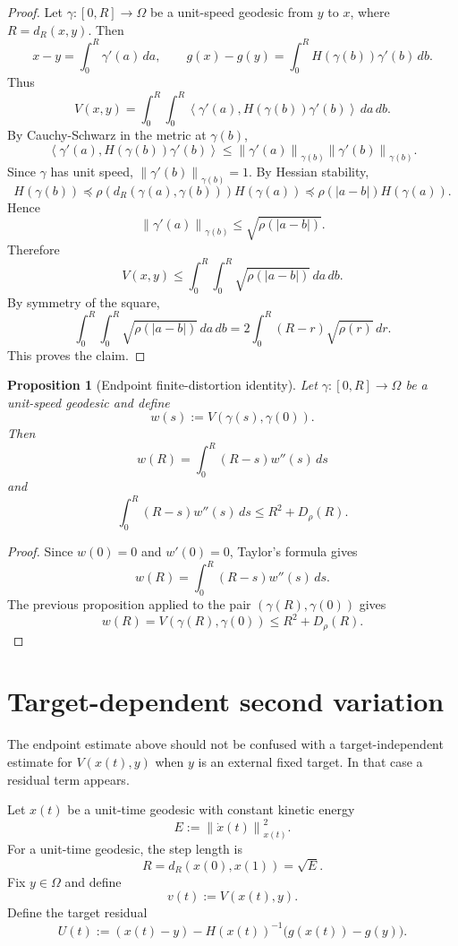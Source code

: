 \documentclass[11pt]{article}
\newtheorem{proposition}{Proposition}
\newcommand{\ip}[2]{\left\langle #1,#2\right\rangle}
\newcommand{\norm}[1]{\left\lVert #1\right\rVert}
\begin{document}
\begin{proof}
Let $\gamma:[0,R]\to\Omega$ be a unit-speed geodesic from $y$ to $x$, where
$R=d_R(x,y)$. Then
\[
    x-y=\int_0^R \gamma'(a)\,da,
    \qquad
    g(x)-g(y)=\int_0^R H(\gamma(b))\gamma'(b)\,db.
\]
Thus
\[
    V(x,y)
    =
    \int_0^R\int_0^R
    \ip{\gamma'(a)}{H(\gamma(b))\gamma'(b)}\,da\,db.
\]
By Cauchy-Schwarz in the metric at $\gamma(b)$,
\[
    \ip{\gamma'(a)}{H(\gamma(b))\gamma'(b)}
    \le
    \norm{\gamma'(a)}_{\gamma(b)}\norm{\gamma'(b)}_{\gamma(b)}.
\]
Since $\gamma$ has unit speed, $\norm{\gamma'(b)}_{\gamma(b)}=1$. By Hessian stability,
\[
    H(\gamma(b))
    \preceq
    \rho(d_R(\gamma(a),\gamma(b)))H(\gamma(a))
    \preceq
    \rho(|a-b|)H(\gamma(a)).
\]
Hence
\[
    \norm{\gamma'(a)}_{\gamma(b)}
    \le
    \sqrt{\rho(|a-b|)}.
\]
Therefore
\[
    V(x,y)
    \le
    \int_0^R\int_0^R \sqrt{\rho(|a-b|)}\,da\,db.
\]
By symmetry of the square,
\[
    \int_0^R\int_0^R \sqrt{\rho(|a-b|)}\,da\,db
    =
    2\int_0^R (R-r)\sqrt{\rho(r)}\,dr.
\]
This proves the claim.
\end{proof}

\begin{proposition}[Endpoint finite-distortion identity]
Let $\gamma:[0,R]\to\Omega$ be a unit-speed geodesic and define
\[
    w(s):=V(\gamma(s),\gamma(0)).
\]
Then
\[
    w(R)=\int_0^R (R-s)w''(s)\,ds
\]
and
\[
    \int_0^R (R-s)w''(s)\,ds
    \le
    R^2+D_\rho(R).
\]
\end{proposition}

\begin{proof}
Since $w(0)=0$ and $w'(0)=0$, Taylor's formula gives
\[
    w(R)=\int_0^R (R-s)w''(s)\,ds.
\]
The previous proposition applied to the pair $(\gamma(R),\gamma(0))$ gives
\[
    w(R)=V(\gamma(R),\gamma(0))
    \le
    R^2+D_\rho(R).
\]
\end{proof}

\section{Target-dependent second variation}

The endpoint estimate above should not be confused with a target-independent estimate for
$V(x(t),y)$ when $y$ is an external fixed target. In that case a residual term appears.

Let $x(t)$ be a unit-time geodesic with constant kinetic energy
\[
    E:=\norm{\dot x(t)}_{x(t)}^2.
\]
For a unit-time geodesic, the step length is
\[
    R=d_R(x(0),x(1))=\sqrt{E}.
\]
Fix $y\in\Omega$ and define
\[
    v(t):=V(x(t),y).
\]
Define the target residual
\[
    U(t)
    :=
    (x(t)-y)
    -
    H(x(t))^{-1}\bigl(g(x(t))-g(y)\bigr).
\]
\end{document}
